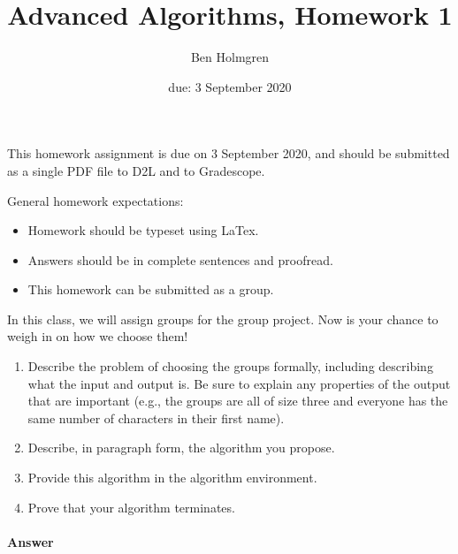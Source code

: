 \documentclass{article}
\title{Advanced Algorithms, Homework 1}
\author{Ben Holmgren}
\date{due: 3 September 2020}
\begin{document}
\maketitle

This homework assignment is due on 3 September 2020, and should be
submitted as a single PDF file to D2L and to Gradescope.

General homework expectations:
\begin{itemize}
    \item Homework should be typeset using LaTex.
    \item Answers should be in complete sentences and proofread.
    \item This homework can be submitted as a group.
\end{itemize}

\nextprob
{}

In this class, we will assign groups for the group project.  Now is your chance
to weigh in on how we choose them!
\begin{enumerate}
    \item Describe the problem of choosing the groups formally, including
        describing what the input and output is.  Be sure to explain any
        properties of the output that are important (e.g., the groups are all of
        size three and everyone has the same number of characters in their first
        name).
    \item Describe, in paragraph form, the algorithm you propose.
    \item Provide this algorithm in the algorithm environment.
    \item Prove that your algorithm terminates.
\end{enumerate}

\paragraph{Answer}

\end{document}
